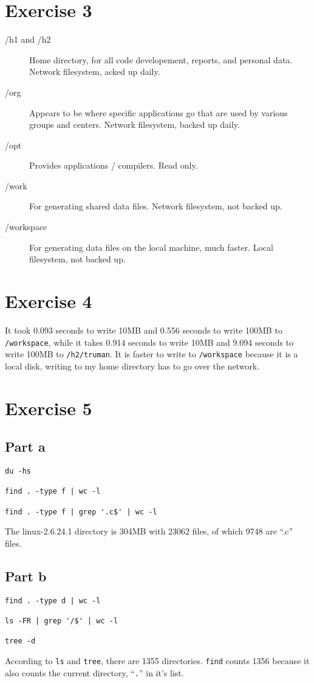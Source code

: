 \documentclass[letterpaper,10pt]{article}
\begin{document}
\section*{Exercise 3}
\begin{description}
\item[/h1 and /h2] Home directory, for all code developement, reports, and
personal data. Network filesystem, acked up daily.
\item[/org] Appears to be where specific applications go that are used by
various groups and centers. Network filesystem, backed up daily.
\item[/opt] Provides applications / compilers. Read only.
\item[/work] For generating shared data files. Network filesystem, not backed
up.
\item[/workspace] For generating data files on the local machine, much faster.
Local filesystem, not backed up.
\end{description}

\section*{Exercise 4}
It took 0.093 seconds to write 10MB and 0.556 seconds to write
100MB to \verb=/workspace=, while it takes 0.914 seconds to write 10MB and 9.094
seconds to write 100MB to \verb=/h2/truman=. It is faster to write to
\verb=/workspace= because it is a local disk, writing to my home directory has
to go over the network.

\section*{Exercise 5}
\subsection*{Part a}
\begin{verbatim}
du -hs

find . -type f | wc -l

find . -type f | grep '.c$' | wc -l
\end{verbatim}

The linux-2.6.24.1 directory is 304MB with 23062 files, of which 9748 are
``.c'' files.

\subsection*{Part b}
\begin{verbatim}
find . -type d | wc -l

ls -FR | grep '/$' | wc -l

tree -d
\end{verbatim}
According to \verb=ls= and \verb=tree=, there are 1355 directories. \verb=find=
counts 1356 because it also counts the current directory, ``\verb=.='' in it's
list.
\end{document}
